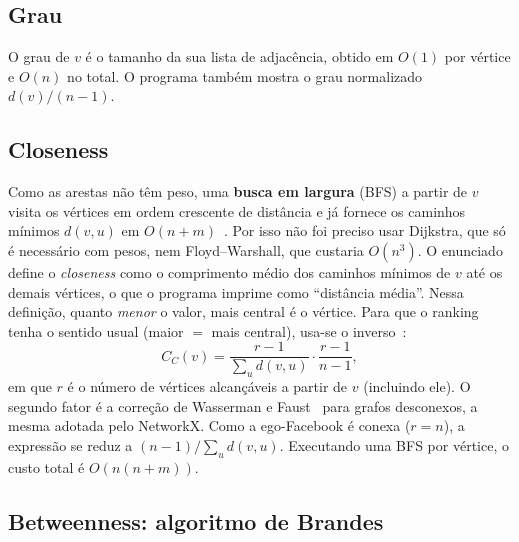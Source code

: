 \documentclass[conference]{IEEEtran}
\begin{document}
\subsection{Grau}

O grau de $v$ é o tamanho da sua lista de adjacência, obtido em $O(1)$ por vértice e $O(n)$ no total. O programa também mostra o grau normalizado $d(v)/(n-1)$.

\subsection{Closeness}

Como as arestas não têm peso, uma \textbf{busca em largura} (BFS) a partir de $v$ visita os vértices em ordem crescente de distância e já fornece os caminhos mínimos $d(v,u)$ em $O(n+m)$~\cite{cormen2012}. Por isso não foi preciso usar Dijkstra, que só é necessário com pesos, nem Floyd--Warshall, que custaria $O(n^3)$. O enunciado define o \textit{closeness} como o comprimento médio dos caminhos mínimos de $v$ até os demais vértices, o que o programa imprime como ``distância média''. Nessa definição, quanto \emph{menor} o valor, mais central é o vértice. Para que o ranking tenha o sentido usual (maior $=$ mais central), usa-se o inverso~\cite{sabidussi1966}:
\begin{equation}
C_C(v) = \frac{r-1}{\sum_{u} d(v,u)} \cdot \frac{r-1}{n-1},
\end{equation}
em que $r$ é o número de vértices alcançáveis a partir de $v$ (incluindo ele). O segundo fator é a correção de Wasserman e Faust~\cite{wasserman1994} para grafos desconexos, a mesma adotada pelo NetworkX. Como a ego-Facebook é conexa ($r=n$), a expressão se reduz a $(n-1)/\sum_u d(v,u)$. Executando uma BFS por vértice, o custo total é $O(n(n+m))$.

\subsection{Betweenness: algoritmo de Brandes}
\end{document}
